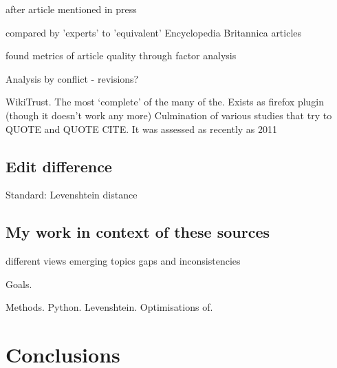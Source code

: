 \documentclass[a4paper,11pt,twoside,notitlepage]{article}
\begin{document}
        after article mentioned in press \cite{Lih2004}

        compared by 'experts' to 'equivalent' Encyclopedia Britannica articles \cite{Giles2005}

        found metrics of article quality through factor analysis
        \cite{Stvilia2005}

        Analysis by conflict - revisions?\cite{Kittur2007}

        WikiTrust. The most `complete' of the many of the. Exists as
        firefox plugin (though it doesn't work any more) Culmination
        of various studies that try to QUOTE \cite{Adler2007} and QUOTE CITE. It
        was assessed as recently as 2011 \cite{Lucassen2011}
       
        \subsection{Edit difference}

        Standard: Levenshtein distance \cite{Levenshtein1966}
        \begin{figure}
        \end{figure}
        \cite{Adler2006}

        \subsection{My work in context of these sources}
        different views emerging topics gaps and inconsistencies

        Goals.

        Methods. Python. Levenshtein. Optimisations of.
     
        \section{Conclusions}
\end{document}
